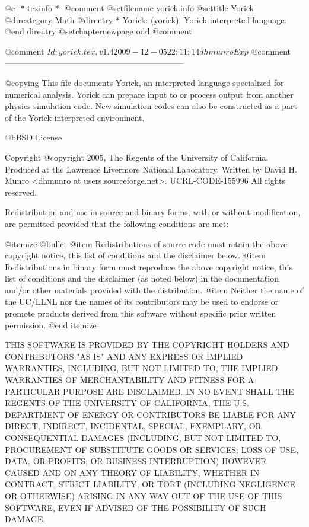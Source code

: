     @c -*-texinfo-*-
@comment %
@setfilename yorick.info
@settitle Yorick
@dircategory Math
@direntry
* Yorick: (yorick).       Yorick interpreted language.
@end direntry
@setchapternewpage odd
@comment %

@comment $Id: yorick.tex,v 1.4 2009-12-05 22:11:14 dhmunro Exp $
@comment -----------------------------------------------------------------

@copying
This file documents Yorick, an interpreted language specialized for
numerical analysis.  Yorick can prepare input to or process output from
another physics simulation code.  New simulation codes can also be
constructed as a part of the Yorick interpreted environment.

@b{BSD License}

Copyright @copyright{} 2005, The Regents of the University of California.
Produced at the Lawrence Livermore National Laboratory.
Written by David H. Munro <dhmunro at users.sourceforge.net>.
UCRL-CODE-155996
All rights reserved.

Redistribution and use in source and binary forms, with or without
modification, are permitted provided that the following conditions are
met:

@itemize @bullet
@item
Redistributions of source code must retain the above copyright
notice, this list of conditions and the disclaimer below.
@item
Redistributions in binary form must reproduce the above copyright
notice, this list of conditions and the disclaimer (as noted below)
in the documentation and/or other materials provided with the
distribution.
@item
Neither the name of the UC/LLNL nor the names of its contributors
may be used to endorse or promote products derived from this software
without specific prior written permission.
@end itemize

THIS SOFTWARE IS PROVIDED BY THE COPYRIGHT HOLDERS AND CONTRIBUTORS
"AS IS" AND ANY EXPRESS OR IMPLIED WARRANTIES, INCLUDING, BUT NOT
LIMITED TO, THE IMPLIED WARRANTIES OF MERCHANTABILITY AND FITNESS FOR
A PARTICULAR PURPOSE ARE DISCLAIMED. IN NO EVENT SHALL THE REGENTS OF
THE UNIVERSITY OF CALIFORNIA, THE U.S. DEPARTMENT OF ENERGY OR
CONTRIBUTORS BE LIABLE FOR ANY DIRECT, INDIRECT, INCIDENTAL, SPECIAL,
EXEMPLARY, OR CONSEQUENTIAL DAMAGES (INCLUDING, BUT NOT LIMITED TO,
PROCUREMENT OF SUBSTITUTE GOODS OR SERVICES; LOSS OF USE, DATA, OR
PROFITS; OR BUSINESS INTERRUPTION) HOWEVER CAUSED AND ON ANY THEORY OF
LIABILITY, WHETHER IN CONTRACT, STRICT LIABILITY, OR TORT (INCLUDING
NEGLIGENCE OR OTHERWISE) ARISING IN ANY WAY OUT OF THE USE OF THIS
SOFTWARE, EVEN IF ADVISED OF THE POSSIBILITY OF SUCH DAMAGE.

